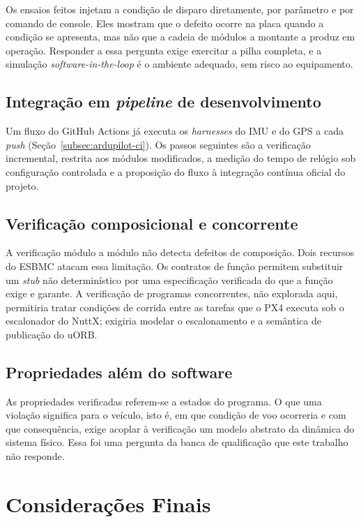 Os ensaios feitos injetam a condição de disparo diretamente, por parâmetro e
por comando de console. Eles mostram que o defeito ocorre na placa quando a
condição se apresenta, mas não que a cadeia de módulos a montante a produz em
operação. Responder a essa pergunta exige exercitar a pilha completa, e a
simulação \textit{software-in-the-loop} é o ambiente adequado, sem risco ao
equipamento.

\subsection{Integração em \textit{pipeline} de desenvolvimento}

Um fluxo do GitHub Actions já executa os \textit{harnesses} do IMU e do GPS a
cada \textit{push} (Seção~\ref{subsec:ardupilot-ci}). Os passos seguintes são a
verificação incremental, restrita aos módulos modificados, a medição do tempo
de relógio sob configuração controlada e a proposição do fluxo à integração
contínua oficial do projeto.

\subsection{Verificação composicional e concorrente}

A verificação módulo a módulo não detecta defeitos de composição. Dois recursos
do ESBMC atacam essa limitação. Os contratos de função permitem substituir um
\textit{stub} não determinístico por uma especificação verificada do que a
função exige e garante. A verificação de programas concorrentes, não explorada
aqui, permitiria tratar condições de corrida entre as tarefas que o PX4 executa
sob o escalonador do NuttX; exigiria modelar o escalonamento e a semântica de
publicação do uORB.

\subsection{Propriedades além do software}

As propriedades verificadas referem-se a estados do programa. O que uma
violação significa para o veículo, isto é, em que condição de voo ocorreria e
com que consequência, exige acoplar à verificação um modelo abstrato da
dinâmica do sistema físico. Essa foi uma pergunta da banca de qualificação que
este trabalho não responde.

\section{Considerações Finais}
\label{sec:conclusao-finais}


